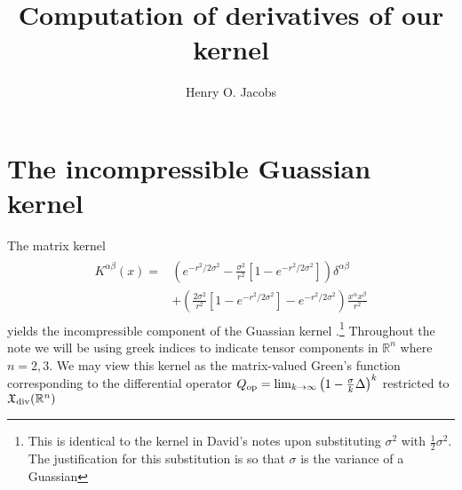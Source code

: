 \documentclass[12pt]{amsart}
\title{Computation of derivatives of our kernel}
\author{Henry O. Jacobs}
\begin{document}
\maketitle
\section{The incompressible Guassian kernel}
The matrix kernel
\begin{align}
\begin{split}  K^{\alpha \beta}(x) =& \left( e^{-r^2/2\sigma^2} - \frac{\sigma^2}{r^2}
    \left[ 1 - e^{-r^2/ 2\sigma^2} \right] \right) \delta^{\alpha \beta} \\
  &+ \left( \frac{2 \sigma^2}{r^2} \left[ 1 - e^{-r^2 / 2 \sigma^2} \right] - e^{-r^2 / 2 \sigma^2 } \right) \frac{x^\alpha x^\beta }{r^2}
  \end{split} \label{eq:kernel}
\end{align}
yields the incompressible component of the Guassian kernel
\cite{MicheliGlaunes2014}.\footnote{This is identical to the kernel in David's notes upon substituting $\sigma^2$ with $\frac{1}{2} \sigma^2$.
The justification for this substitution is so that $\sigma$ is the variance of a Guassian}
Throughout the note we will be using greek indices to indicate tensor
components in $\mathbb{R}^n$ where $n = 2,3$.
We may view this kernel as the matrix-valued Green's function
corresponding to the differential operator $Q_{\rm op} = \lim_{k \to
  \infty} \left( 1 - \frac{\sigma}{k}\Delta \right)^k$ restricted to
  $\mathfrak{X}_{\rm div}( \mathbb{R}^n)$
\end{document}
